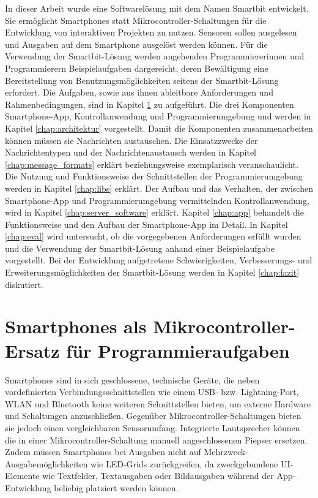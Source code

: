 \documentclass[11pt,a4paper]{report}
\begin{document}
In dieser Arbeit wurde eine Softwarelösung mit dem Namen Smartbit entwickelt.
Sie ermöglicht Smartphones statt Mikrocontroller-Schaltungen für die Entwicklung von interaktiven Projekten zu nutzen. 
Sensoren sollen ausgelesen und Ausgaben auf dem Smartphone ausgelöst werden können.
Für die Verwendung der Smartbit-Lösung werden angehenden Programmiererinnen und Programmierern Beispielaufgaben dargereicht, deren Bewältigung eine Bereitstellung von Benutzungsmöglichkeiten seitens der Smartbit-Lösung erfordert.
Die Aufgaben, sowie aus ihnen ableitbare Anforderungen und Rahmenbedingungen, sind in Kapitel \ref{chap:Experimente} zu aufgeführt.
Die drei Komponenten Smartphone-App, Kontrollanwendung und Programmierumgebung und werden in Kapitel \ref{chap:architektur} vorgestellt.
Damit die Komponenten zusammenarbeiten können müssen sie Nachrichten austauschen.
Die Einsatzzwecke der Nachrichtentypen und der Nachrichtenaustausch werden in Kapitel \ref{chap:message_formats} erklärt beziehungsweise exemplarisch veranschaulicht.
Die Nutzung und Funktionsweise der Schnittstellen der Programmierumgebung werden in Kapitel \ref{chap:libs} erklärt.
Der Aufbau und das Verhalten, der zwischen Smartphone-App und Programmierumgebung vermittelnden Kontrollanwendung, wird in Kapitel \ref{chap:server_software} erklärt.
Kapitel \ref{chap:app} behandelt die Funktionsweise und den Aufbau der Smartphone-App im Detail.
In Kapitel \ref{chap:eval} wird untersucht, ob die vorgegebenen Anforderungen erfüllt wurden und die Verwendung der Smartbit-Lösung anhand einer Beispielaufgabe vorgestellt.
Bei der Entwicklung aufgetretene Schwierigkeiten, Verbesserungs- und Erweiterungsmöglichkeiten der Smartbit-Lösung werden in Kapitel \ref{chap:fazit} diskutiert.

\chapter{Smartphones als Mikrocontroller-Ersatz für Programmieraufgaben} \label{chap:Experimente}
Smartphones sind in sich geschlossene, technische Geräte, die neben vordefinierten Verbindungsschnittstellen wie einem USB- bzw. Lightning-Port, WLAN und Bluetooth keine weiteren Schnittstellen bieten, um externe Hardware und Schaltungen anzuschließen.
Gegenüber Mikrocontroller-Schaltungen bieten sie jedoch einen vergleichbaren Sensorumfang.
Integrierte Lautsprecher können die in einer Mikrocontroller-Schaltung  manuell angeschlossenen Piepser ersetzen.
Zudem müssen Smartphones bei Ausgaben nicht auf Mehrzweck-Ausgabemöglichkeiten wie LED-Grids zurückgreifen, da zweckgebundene UI-Elemente wie Textfelder, Textausgaben oder Bildausgaben während der App-Entwicklung beliebig platziert werden können.
\end{document}
